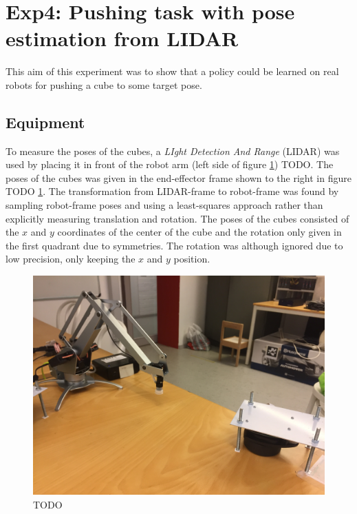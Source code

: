 \section{Exp4: Pushing task with pose estimation from LIDAR}

This aim of this experiment was to show that a policy could be learned on
real robots for pushing a cube to some target pose.

\subsection{Equipment}

To measure the poses of the cubes, a \textit{LIght Detection And Range} (LIDAR)
was used by placing it in front of the robot arm (left side of figure
\ref{fig:eef-frame}) TODO. The poses of the cubes was given in the end-effector
frame shown to the right in figure TODO \ref{fig:eef-frame}. The transformation from
LIDAR-frame to robot-frame was found by sampling robot-frame poses and using a
least-squares approach rather than explicitly measuring translation and
rotation. The poses of the cubes consisted of the $x$ and $y$ coordinates of the
center of the cube and the rotation only given in the first quadrant due to
symmetries. The rotation was although ignored due to low precision, only
keeping the $x$ and $y$ position.

\begin{figure}[h!]
    \centering
    \includegraphics[width=0.48 \textwidth]{res/lidar_placement.JPG}

    \caption{TODO}
    \label{fig:eef-frame}
    
\end{figure}

